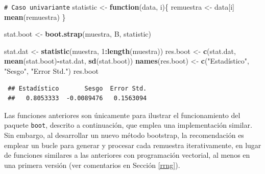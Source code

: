 \documentclass[
  spanish,
  10pt,
]{book}
\newenvironment{Shaded}{\begin{snugshade}}{\end{snugshade}}
\newcommand{\CommentTok}[1]{\textcolor[rgb]{0.56,0.35,0.01}{\textit{#1}}}
\newcommand{\ControlFlowTok}[1]{\textcolor[rgb]{0.13,0.29,0.53}{\textbf{#1}}}
\newcommand{\DecValTok}[1]{\textcolor[rgb]{0.00,0.00,0.81}{#1}}
\newcommand{\FunctionTok}[1]{\textcolor[rgb]{0.13,0.29,0.53}{\textbf{#1}}}
\newcommand{\NormalTok}[1]{#1}
\newcommand{\OtherTok}[1]{\textcolor[rgb]{0.56,0.35,0.01}{#1}}
\newcommand{\SpecialCharTok}[1]{\textcolor[rgb]{0.81,0.36,0.00}{\textbf{#1}}}
\newcommand{\StringTok}[1]{\textcolor[rgb]{0.31,0.60,0.02}{#1}}
\theoremstyle{break}
\theoremstyle{nonumberplain}
\renewcommand{\CommentTok}[1]{\textcolor[rgb]{0.41,0.41,0.41}{\texttt{#1}}}
\begin{document}
\begin{Shaded}
\begin{Highlighting}[]
\CommentTok{\# Caso univariante}
\NormalTok{statistic }\OtherTok{\textless{}{-}} \ControlFlowTok{function}\NormalTok{(data, i)\{}
\NormalTok{  remuestra }\OtherTok{\textless{}{-}}\NormalTok{ data[i]}
  \FunctionTok{mean}\NormalTok{(remuestra)}
\NormalTok{\}}

\NormalTok{stat.boot }\OtherTok{\textless{}{-}} \FunctionTok{boot.strap}\NormalTok{(muestra, B, statistic)}

\NormalTok{stat.dat }\OtherTok{\textless{}{-}} \FunctionTok{statistic}\NormalTok{(muestra, }\DecValTok{1}\SpecialCharTok{:}\FunctionTok{length}\NormalTok{(muestra))}
\NormalTok{res.boot }\OtherTok{\textless{}{-}} \FunctionTok{c}\NormalTok{(stat.dat, }\FunctionTok{mean}\NormalTok{(stat.boot)}\SpecialCharTok{{-}}\NormalTok{stat.dat, }\FunctionTok{sd}\NormalTok{(stat.boot))}
\FunctionTok{names}\NormalTok{(res.boot) }\OtherTok{\textless{}{-}} \FunctionTok{c}\NormalTok{(}\StringTok{"Estadístico"}\NormalTok{, }\StringTok{"Sesgo"}\NormalTok{, }\StringTok{"Error Std."}\NormalTok{)}
\NormalTok{res.boot}
\end{Highlighting}
\end{Shaded}

\begin{verbatim}
 ## Estadístico       Sesgo  Error Std. 
 ##   0.8053333  -0.0089476   0.1563094
\end{verbatim}

\begin{Shaded}
\end{Shaded}

Las funciones anteriores son únicamente para ilustrar el funcionamiento del paquete \texttt{boot}, descrito a continuación, que emplea una implementación similar.
Sin embargo, al desarrollar un nuevo método bootstrap, la recomendación es emplear un bucle para generar y procesar cada remuestra iterativamente, en lugar de funciones similares a las anteriores con programación vectorial, al menos en una primera versión (ver comentarios en Sección \ref{rrng}).
\end{document}
